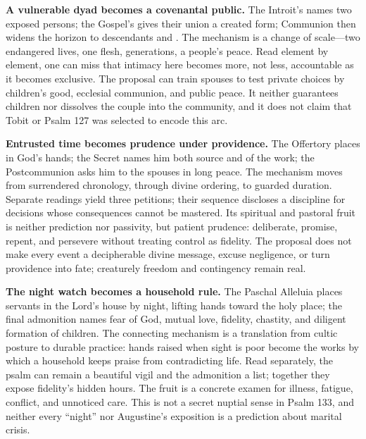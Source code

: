\noindent\textbf{A vulnerable dyad becomes a covenantal public.\enspace{}}
The Introit's  names two exposed persons; the Gospel's  gives their union a created form; Communion then widens the horizon to descendants and . The mechanism is a change of scale---two endangered lives, one flesh, generations, a people's peace. Read element by element, one can miss that intimacy here becomes more, not less, accountable as it becomes exclusive. The proposal can train spouses to test private choices by children's good, ecclesial communion, and public peace. It neither guarantees children nor dissolves the couple into the community, and it does not claim that Tobit or Psalm 127 was selected to encode this arc.

\noindent\textbf{Entrusted time becomes prudence under providence.\enspace{}}
The Offertory places  in God's hands; the Secret names him both source and  of the work; the Postcommunion asks him to  the spouses in long peace. The mechanism moves from surrendered chronology, through divine ordering, to guarded duration. Separate readings yield three petitions; their sequence discloses a discipline for decisions whose consequences cannot be mastered. Its spiritual and pastoral fruit is neither prediction nor passivity, but patient prudence: deliberate, promise, repent, and persevere without treating control as fidelity. The proposal does not make every event a decipherable divine message, excuse negligence, or turn providence into fate; creaturely freedom and contingency remain real.

\noindent\textbf{The night watch becomes a household rule.\enspace{}}
The Paschal Alleluia places servants in the Lord's house by night, lifting hands toward the holy place; the final admonition names fear of God, mutual love, fidelity, chastity, and diligent formation of children. The connecting mechanism is a translation from cultic posture to durable practice: hands raised when sight is poor become the works by which a household keeps praise from contradicting life. Read separately, the psalm can remain a beautiful vigil and the admonition a list; together they expose fidelity's hidden hours. The fruit is a concrete examen for illness, fatigue, conflict, and unnoticed care. This is not a secret nuptial sense in Psalm 133, and neither every ``night'' nor Augustine's exposition is a prediction about marital crisis.

